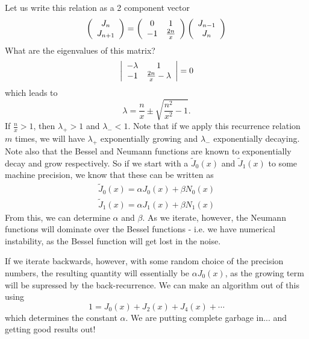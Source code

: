 \documentclass{mathnotes}
\begin{document}
Let us write this relation as a 2 component vector
\begin{align*}
\left(\begin{array}{c}
    J_n\\
    J_{n+1}
\end{array}\right)
=
\left(
\begin{array}[]{cc}
    0 & 1\\
    -1 & \frac{2n}{x}
\end{array}
\right)
\left( 
\begin{array}{c}
    J_{n-1}\\
    J_{n}
\end{array}\right)
\end{align*}
What are the eigenvalues of this matrix?
\begin{align*}
    \left|\begin{array}[]{cc}
        -\lambda & 1\\
        -1 & \frac{2n}{x}-\lambda
    \end{array}\right|=0
\end{align*}
which leads to
\[\lambda=\frac{n}{x}\pm\sqrt{\frac{n^2}{x^2}-1}.\]
If $\frac{n}{x}>1$, then $\lambda_+>1$ and $\lambda_-<1$. Note that if we apply this recurrence relation $m$ times,
we will have $\lambda_+$ exponentially growing and $\lambda_-$ exponentially decaying. Note also that the Bessel and Neumann functions
are known to exponentially decay and grow respectively. So if we start with a $\tilde{J}_0(x)$ and $\tilde{J}_1(x)$ to some machine precision,
we know that these can be written as
\begin{align*}
    \tilde{J}_0(x)= \alpha J_{0}(x)+\beta N_0(x)\\
    \tilde{J}_1(x)= \alpha J_{1}(x)+\beta N_1(x)
\end{align*}
From this, we can determine $\alpha$ and $\beta$. As we iterate, however, the Neumann functions will dominate over the Bessel functions - i.e. we have
numerical instability, as the Bessel function will get lost in the noise.

If we iterate backwards, however, with some random choice of the precision numbers, the resulting quantity will essentially be $\alpha J_0(x)$, as the
growing term will be supressed by the back-recurrence. We can make an algorithm out of this using
\[1=J_0(x)+J_2(x)+J_4(x)+\cdots\]
which determines the constant $\alpha$. We are putting complete garbage in... and getting good results out!
\end{document}
